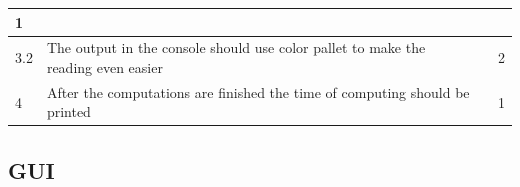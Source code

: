 \documentclass{article}
\begin{document}
\begin{center}
\begin{longtable}{| l | p{4cm} | p{3.5cm} | l |}
		1
		\\ \hline
		
		
		3.2 & 
		
		The output in the console should use color pallet to make the reading even easier& 
		
		&
		 
		2
		\\ \hline
		

		4 & 
		
		After the computations are finished the time of computing should be printed& 
		
		&
		 
		1
		\\ \hline		
		
	\end{longtable}
\end{center}	




\subsection{GUI} \label{GUI_func_req}
\end{document}
